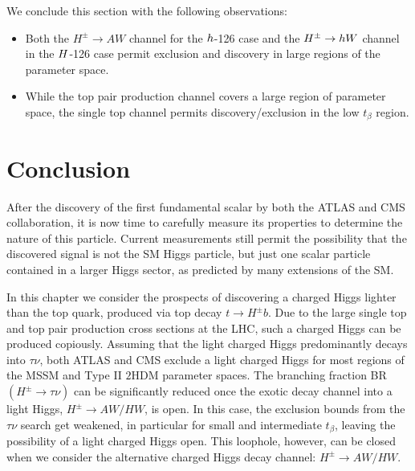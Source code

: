  We conclude this section with the following observations: 
\begin{itemize}
\item Both the $H^{\pm} \rightarrow A W$ channel for the $h$-126 case and the $H^{\pm} \rightarrow h W$ channel in the $H$-126 case permit exclusion and discovery in large regions of the parameter space.

\item While the top pair production channel covers a large region of parameter space, the single top channel permits discovery/exclusion in the low $t_{\beta}$ region.  
\end{itemize} 

\section{Conclusion}
\label{sec:light_charged_conclusion}
After the discovery of the first fundamental scalar by both the ATLAS and CMS collaboration, it is now time to carefully measure its properties to determine the nature of this particle. Current measurements still permit the possibility that the discovered signal is not the SM Higgs particle, but just one scalar particle contained in a larger Higgs sector, as predicted by many extensions of the SM.

In this chapter we consider the prospects of discovering a charged Higgs lighter than the top quark, produced via top decay $t \rightarrow H^{\pm} b$. Due to the large single top and top pair production cross sections at the LHC, such a charged Higgs can be produced copiously. Assuming that the light charged Higgs predominantly decays into $\tau\nu$, both ATLAS and CMS exclude a light charged Higgs for most regions of the MSSM and Type II $2$HDM parameter spaces. The branching fraction BR$(H^{\pm} \rightarrow \tau\nu)$ can be significantly reduced once the exotic decay channel into a light Higgs, $H^{\pm} \rightarrow AW/HW$, is open. In this case, the exclusion bounds from the $\tau\nu$ search get weakened, in particular for small and intermediate $t_{\beta}$, leaving the possibility of a light charged Higgs open. This loophole, however, can be closed when we consider the alternative charged Higgs decay channel: $H^\pm \to AW/HW$.

